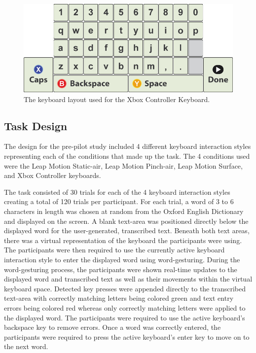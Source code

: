 \begin{figure}[!t]
	\centering
	\includegraphics[width=6in]{Figures/fig_xbox_keyboard}
	\caption[Xbox Controller Keyboard Layout]{The keyboard layout used for the Xbox Controller Keyboard.}
	\label{fig_xbox_keyboard}
\end{figure}

\subsection{Task Design} \label{pre_task}
The design for the pre-pilot study included 4 different keyboard interaction styles representing each of the conditions that made up the task. The 4 conditions used were the Leap Motion Static-air, Leap Motion Pinch-air, Leap Motion Surface, and Xbox Controller keyboards.

The task consisted of 30 trials for each of the 4 keyboard interaction styles creating a total of 120 trials per participant. For each trial, a word of 3 to 6 characters in length was chosen at random from the Oxford English Dictionary and displayed on the screen. A blank text-area was positioned directly below the displayed word for the user-generated, transcribed text. Beneath both text areas, there was a virtual representation of the keyboard the participants were using. The participants were then required to use the currently active keyboard interaction style to enter the displayed word using word-gesturing. During the word-gesturing process, the participants were shown real-time updates to the displayed word and transcribed text as well as their movements within the virtual keyboard space. Detected key presses were appended directly to the transcribed text-area with correctly matching letters being colored green and text entry errors being colored red whereas only correctly matching letters were applied to the displayed word. The participants were required to use the active keyboard's backspace key to remove errors. Once a word was correctly entered, the participants were required to press the active keyboard's enter key to move on to the next word.

